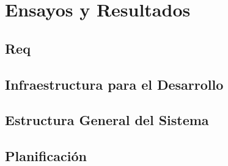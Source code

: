 \chapter{Ensayos y Resultados}
\label{Chapter4}

\section{Req}

\section{Infraestructura para el Desarrollo}

\section{Estructura General del Sistema}

\section{{Planificación}}
